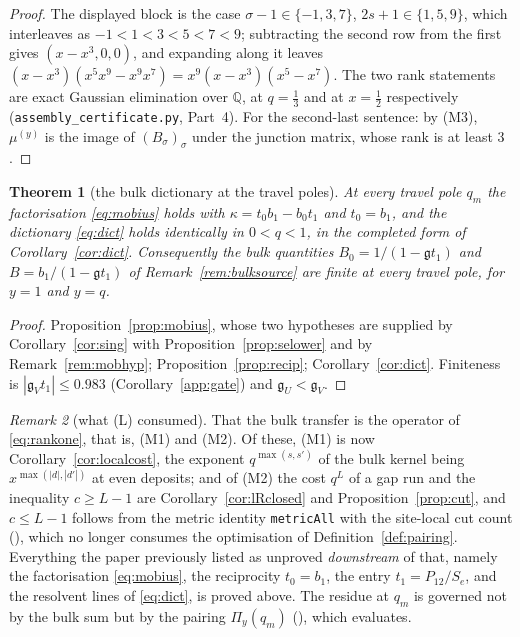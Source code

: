 \documentclass[11pt]{article}
\theoremstyle{plain}
\newtheorem{theorem}{Theorem}
\theoremstyle{definition}
\theoremstyle{remark}
\newtheorem{remark}[theorem]{Remark}
\newcommand{\Q}{\mathbb{Q}}
\begin{document}
\begin{proof}
The displayed block is the case $\sigma-1\in\{-1,3,7\}$, $2s+1\in\{1,5,9\}$, which interleaves as
$-1<1<3<5<7<9$; subtracting the second row from the first gives $(x-x^3,0,0)$, and expanding along
it leaves $(x-x^3)(x^5x^9-x^9x^7)=x^9(x-x^3)(x^5-x^7)$. The two rank statements are exact Gaussian
elimination over $\Q$, at $q=\tfrac13$ and at $x=\tfrac12$ respectively
(\texttt{assembly\_certificate.py}, Part~4). For the second-last sentence: by \textup{(M3)}, $\mu^{(y)}$
is the image of $(B_\sigma)_\sigma$ under the junction matrix, whose rank is at least $3$.
\end{proof}

\begin{theorem}[the bulk dictionary at the travel poles]\label{thm:L}
At every travel pole $q_m$ the factorisation \eqref{eq:mobius} holds with
$\kappa=t_0b_1-b_0t_1$ and $t_0=b_1$, and the dictionary \eqref{eq:dict} holds identically in
$0<q<1$, in the completed form of Corollary~\ref{cor:dict}. Consequently the bulk quantities
$B_0=1/(1-\mathfrak gt_1)$ and $B=b_1/(1-\mathfrak gt_1)$ of Remark~\ref{rem:bulksource} are finite at
every travel pole, for $y=1$ and $y=q$.
\end{theorem}

\begin{proof}
Proposition~\ref{prop:mobius}, whose two hypotheses are supplied by Corollary~\ref{cor:sing} with
Proposition~\ref{prop:selower} and by Remark~\ref{rem:mobhyp}; Proposition~\ref{prop:recip};
Corollary~\ref{cor:dict}. Finiteness is $|\mathfrak g_Vt_1|\le0.983$ (Corollary~\ref{app:gate}) and
$\mathfrak g_U<\mathfrak g_V$.
\end{proof}

\begin{remark}[what \textup{(L)} consumed]\label{rem:Lgap}
That the bulk transfer is the operator of \eqref{eq:rankone}, that is, \textup{(M1)} and
\textup{(M2)}. Of these, \textup{(M1)} is now Corollary~\ref{cor:localcost}, the exponent
$q^{\max(s,s')}$ of the bulk kernel being $x^{\max(|d|,|d'|)}$ at even deposits; and of
\textup{(M2)} the cost $q^L$ of a gap run and the inequality $c\ge L-1$ are
Corollary~\ref{cor:lRclosed} and Proposition~\ref{prop:cut}, and $c\le L-1$ follows from the metric
identity \texttt{metricAll} with the site-local cut count ({\cite[Theorem ``the transfer model \textup{(M)}'', \textup{thm:model}]{Bonfioli2026bA}}), which no
longer consumes the optimisation of Definition~\ref{def:pairing}. Everything the paper previously listed as
unproved \emph{downstream} of that, namely the factorisation \eqref{eq:mobius}, the reciprocity
$t_0=b_1$, the entry $t_1=P_{12}/S_e$, and the resolvent lines of \eqref{eq:dict}, is proved above.
The residue at $q_m$ is governed not by the bulk sum but by the pairing $\Pi_y(q_m)$
({\cite[Proposition ``the shape of the local form'', \textup{prop:shape}]{Bonfioli2026bA}}), which {\cite[Theorem ``closed form of the junction pairing'', \textup{thm:RJ}]{Bonfioli2026bA}} evaluates.
\end{remark}
\end{document}
